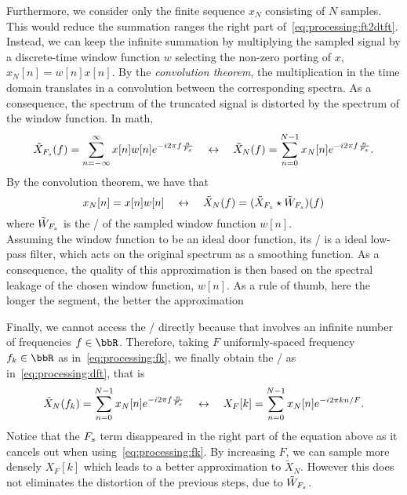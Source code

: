 \mynewline
Furthermore, we consider only the finite sequence $x_N$ consisting of $N$ samples.
This would reduce the summation ranges the right part of~\cref{eq:processing:ft2dtft}.
Instead, we can keep the infinite summation by multiplying the sampled signal by a discrete-time window function ${w}$ selecting the non-zero porting of $x$, $x_N[n] = {w}[n]x[n]$.
By the \textit{convolution theorem}, the multiplication in the time domain translates in a convolution between the corresponding spectra.
As a consequence, the spectrum of the truncated signal is distorted by the spectrum of the window function.
In math,
\begin{equation}\label{eq:processing:dft2dtft}
    \tilde{X}_{F_s}( f) =
    \sum_{n = -\infty}^{\infty}
    x[ n] {w}[ n]
    {e}^{-{i}2\pi f \frac{n}{F_s}}
    \quad \leftrightarrow \quad
    \tilde{X}_N(f) =
    \sum_{n=0}^{N-1}
    x_N[n]
    {e}^{-{i}2\pi f \frac{n}{F_s}}
    .
\end{equation}
By the convolution theorem, we have that
\begin{equation}
    x_N[n] = x[ n] {w}[ n]
    \quad \leftrightarrow \quad
    \tilde{X}_{N}(f) = (\tilde{X}_{F_s} \star \tilde{W}_{F_s})(f)
\end{equation}
where $\tilde{W}_{F_s}$ is the \DTFT/ of the sampled window function ${w}[n]$.
\\Assuming the window function to be an ideal door function, its \DTFT/ is a ideal low-pass filter, which acts on the original spectrum as a smoothing function.
As a consequence, the quality of this approximation is then based on the spectral leakage of the chosen window function, $w[n]$.
As a rule of thumb, here the longer the segment, the better the approximation%

\mynewline
Finally, we cannot access the \DTFT/ directly because that involves an infinite number of frequencies $f \in \R$.
Therefore, taking $F$ uniformly-spaced frequency $f_k\in\R$ as in~\cref{eq:processing:fk}, we finally obtain the \DFT/ as in~\cref{eq:processing:dft}, that is
\begin{equation}
    \tilde{X}_N(f_k) =
    \sum_{n=0}^{N-1}
    x_N[n]
    {e}^{-{i}2\pi f \frac{n}{F_s}}
    \quad \leftrightarrow \quad
    X_F[k] =
    \sum_{n=0}^{N-1}
    x_N[n]
    {e}^{-{i}2\pi k n / F}
    .
\end{equation}
Notice that the $F_s$ term disappeared in the right part of the equation above as it cancels out when using~\cref{eq:processing:fk}.
By increasing $F$, we can sample more densely $X_F[k]$ which leads to a better approximation to $\tilde{X}_N$.
However this does not eliminates the distortion of the previous steps, due to $\tilde{W}_{F_s}$.

